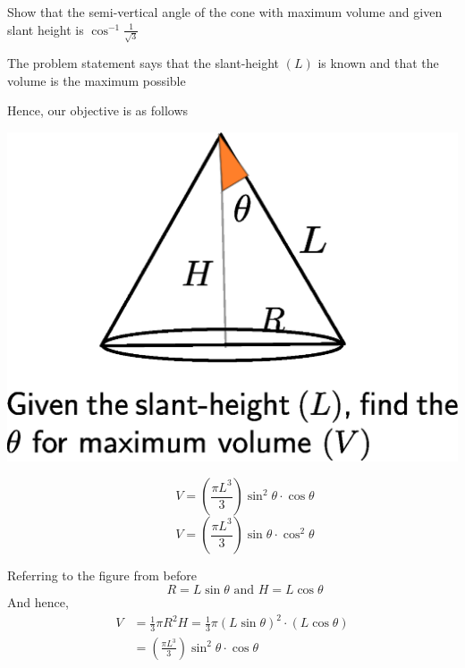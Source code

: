 \documentclass[14pt,fleqn]{extarticle}
\newcommand\ans{\cos^{-1} \frac{1}{\sqrt{3}}}
\newcommand\kexp{ \left(\frac{\pi L^3}{3} \right)}
\begin{document}
\begin{problem}
	\statement 
    
    Show that the semi-vertical angle of the cone with maximum volume and given 
    slant height is $\ans$      
    
    \begin{step}
  \begin{options} 
        
    \end{options} 
     \reason 
     
     The problem statement says that the slant-height $(L)$ is known and that 
     the volume is the maximum possible \newline 
     
     Hence, our objective is as follows 
     \begin{center}
\includegraphics[scale=0.45]{figure.eps}
\end{center}
\end{step}


\begin{step}
  \begin{options} 
     \correct 
     \[ \qquad V = \kexp \sin^2\theta\cdot \cos\theta \]  
     \incorrect
        \[ \qquad V = \kexp \sin\theta\cdot \cos^2\theta \]
    \end{options} 
     \reason 
       
     Referring to the figure from before 
     \[ \qquad R = L\sin\theta \text{ and } H = L\cos\theta \] 
     And hence, 
     \begin{align}
	V &= \frac{1}{3}\pi R^2 H = \frac{1}{3}\pi \left(L\sin\theta \right)^2\cdot \left( L\cos\theta \right) \\
	&= \kexp \sin^2\theta\cdot \cos\theta 
\end{align}
\end{step}


\end{problem}
\end{document}
